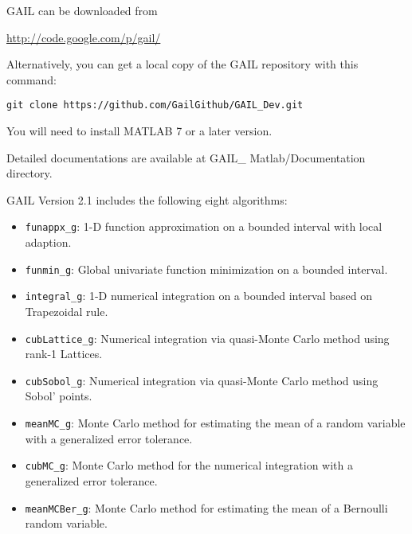 \documentclass{iitthesis}
\theoremstyle{definition}
\begin{document}
GAIL can be downloaded from

\url{http://code.google.com/p/gail/}

Alternatively, you can get a local copy of the GAIL repository with this command:
\begin{lstlisting}
git clone https://github.com/GailGithub/GAIL_Dev.git
\end{lstlisting}
You will need to install MATLAB 7 or a later version.


Detailed documentations are available at GAIL\_ Matlab/Documentation directory.

GAIL Version 2.1 \cite{GAIL_2_1} includes the following eight algorithms:
\begin{itemize}
\item {\tt funappx\_g}: 1-D function approximation on a bounded interval with local adaption.
\item {\tt funmin\_g}: Global univariate function minimization on a bounded interval.
\item {\tt integral\_g}: 1-D numerical integration on a bounded interval based on Trapezoidal rule.
\item {\tt cubLattice\_g}: Numerical integration via quasi-Monte Carlo method using rank-1 Lattices.
\item {\tt cubSobol\_g}: Numerical integration via quasi-Monte Carlo method using Sobol’ points.
\item {\tt meanMC\_g}: Monte Carlo method for estimating the mean of a random variable with a generalized error tolerance.
\item {\tt cubMC\_g}: Monte Carlo method for the numerical integration with a generalized error tolerance.
\item  {\tt meanMCBer\_g}: Monte Carlo method for estimating the mean of a Bernoulli random variable.
\end{itemize}
\end{document}

